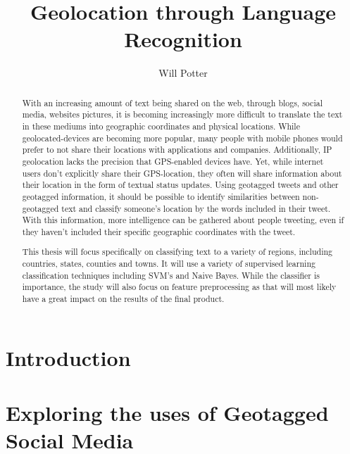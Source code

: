 \documentclass[midd]{thesis}
\title {Geolocation through Language Recognition}
\author {Will Potter}
\begin{document}
\maketitle

\begin{abstract}
With an increasing amount of text being shared on the web, through blogs, social media, websites pictures, it is becoming increasingly more difficult to translate the text in these mediums into geographic coordinates and physical locations. While geolocated-devices are becoming more popular, many people with mobile phones would prefer to not share their locations with applications and companies. Additionally, IP geolocation lacks the precision that GPS-enabled devices have. Yet, while internet users don't explicitly share their GPS-location, they often will share information about their location in the form of textual status updates. Using geotagged tweets and other geotagged information, it should be possible to identify similarities between non-geotagged text and classify someone's location by the words included in their tweet. With this information, more intelligence can be gathered about people tweeting, even if they haven't included their specific geographic coordinates with the tweet.

This thesis will focus specifically on classifying text to a variety of regions, including countries, states, counties and towns. It will use a variety of supervised learning classification techniques including SVM's and Naive Bayes. While the classifier is importance, the study will also focus on feature preprocessing as that will most likely have a great impact on the results of the final product.
\end{abstract}

\begin{acknowledgements}
% 
\end{acknowledgements}

\contentspage
\tablelistpage
\figurelistpage

\normalspacing \setcounter{page}{1} 

\chapter{Introduction}

\chapter{Exploring the uses of Geotagged Social Media}
\end{document}
